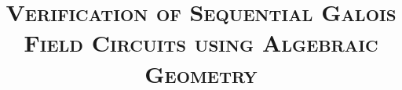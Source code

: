 \documentclass[10pt,twoside]{IEEEtran}
\newcommand{\ls}[1]
    {\dimen0=\fontdimen6\the\font
     \lineskip=#1\dimen0
     \advance\lineskip.5\fontdimen5\the\font
     \advance\lineskip-\dimen0
     \lineskiplimit=.9\lineskip
     \baselineskip=\lineskip
     \advance\baselineskip\dimen0
     \normallineskip\lineskip
     \normallineskiplimit\lineskiplimit
     \normalbaselineskip\baselineskip
     \ignorespaces
    }
\begin{document}


\title{\large{\textsc{Verification of Sequential Galois Field
Circuits using Algebraic Geometry}}}

\author{

}
 
\maketitle

\newcommand{\Fq}{{\mathbb{F}}_{q}}
\newcommand{\Fkk}{{\mathbb{F}}_{2^k}}
\newcommand{\Fkkx}[1][x]{\ensuremath{\mathbb{F}}_{2^k}[#1]\xspace}
\newcommand{\Grobner}{Gr\"{o}bner\xspace}
\newcommand{\B}{{\mathbb{B}}}
\newcommand{\Z}{{\mathbb{Z}}}
\newcommand{\F}{{\mathcal{F}}}
\newcommand{\G}{{\mathcal{G}}}

\newcommand{\debug}[1]{\textcolor{gray}{[ #1 ]}}



%
%
%
%
%
%
%


%
\end{document}
